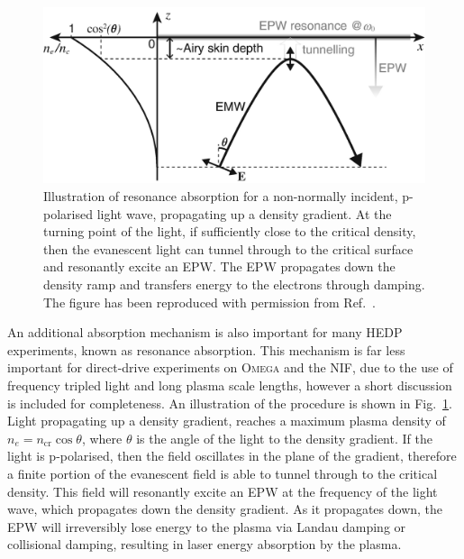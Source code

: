 \begin{figure}[t!]
    \includegraphics[width=0.65\linewidth]{Theory/Images/Res_Abs.png}
    \centering
    \caption{Illustration of resonance absorption for a non-normally incident, p-polarised light wave, propagating up a density gradient.
    At the turning point of the light, if sufficiently close to the critical density, then the evanescent light can tunnel through to the critical surface and resonantly excite an \ac{EPW}.
    The \ac{EPW} propagates down the density ramp and transfers energy to the electrons through damping.
    The figure has been reproduced with permission from Ref.~\cite{michel_introduction_2023}.}%
    \label{fig:theory_res_abs}
\end{figure}

An additional absorption mechanism is also important for many \ac{HEDP} experiments, known as resonance absorption.
This mechanism is far less important for direct-drive experiments on \textsc{Omega} and the \ac{NIF}, due to the use of frequency tripled light and long plasma scale lengths, however a short discussion is included for completeness.
An illustration of the procedure is shown in Fig.~\ref{fig:theory_res_abs}.
Light propagating up a density gradient, reaches a maximum plasma density of $n_e = n_{\text{cr}} \cos{\theta}$, where $\theta$ is the angle of the light to the density gradient.
If the light is p-polarised, then the field oscillates in the plane of the gradient, therefore a finite portion of the evanescent field is able to tunnel through to the critical density.
This field will resonantly excite an \ac{EPW} at the frequency of the light wave, which propagates down the density gradient.
As it propagates down, the \ac{EPW} will irreversibly lose energy to the plasma via Landau damping or collisional damping, resulting in laser energy absorption by the plasma.

